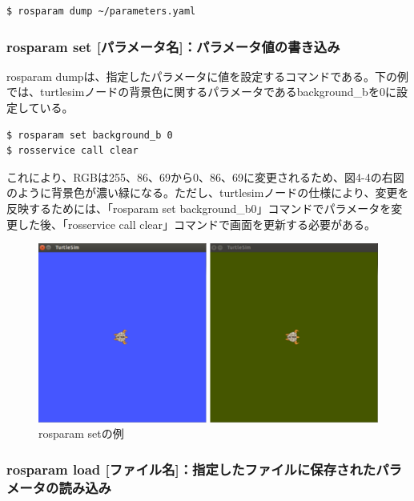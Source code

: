 \begin{lstlisting}[language=ROS]
$ rosparam dump ~/parameters.yaml
\end{lstlisting}

\subsubsection{rosparam set [パラメータ名]：パラメータ値の書き込み}

rosparam dumpは、指定したパラメータに値を設定するコマンドである。下の例では、turtlesimノードの背景色に関するパラメータであるbackground\_bを0に設定している。

\begin{lstlisting}[language=ROS]
$ rosparam set background_b 0
$ rosservice call clear
\end{lstlisting}

これにより、RGBは255、86、69から0、86、69に変更されるため、図4-4の右図のように背景色が濃い緑になる。ただし、turtlesimノードの仕様により、変更を反映するためには、「rosparam set background\_b0」コマンドでパラメータを変更した後、「rosservice call clear」コマンドで画面を更新する必要がある。

\begin{figure}[h]
  \centering
  \includegraphics[width=15cm]{pictures/chapter4/pic_04_04.png}
  \caption{rosparam setの例}
\end{figure}

\subsubsection{rosparam load [ファイル名]：指定したファイルに保存されたパラメータの読み込み}

